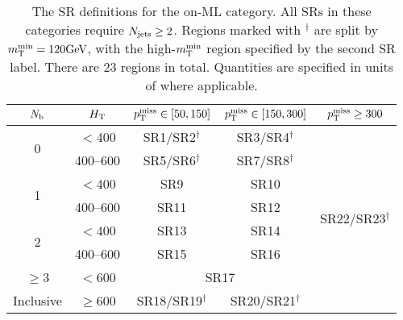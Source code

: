 \begin{table*}[htb!]
    \centering
            \begin{tabular}{|c|c|c|c|c|}
            \hline
                $N_\mathrm{b}$               & $H_{\mathrm{T}}$  & $p_{\mathrm{T}}^\text{miss}\in[50,150]$   & $p_{\mathrm{T}}^\text{miss}\in[150,300]$ & $p_{\mathrm{T}}^\text{miss}\geq300$ \\ \hline
                \multirow{2}{*}{0}      & $<$400      & SR1/SR2${}^\dagger$      & SR3/SR4${}^\dagger$     & \multirow{8}{*}{SR22/SR23${}^\dagger$}\\ \cline{2-2}
                                        & 400--600     & SR5/SR6${}^\dagger$      & SR7/SR8${}^\dagger$     & \\ \cline{1-2}
                \multirow{2}{*}{1}      & $<$400      & SR9                       & SR10                      & \\ \cline{2-2}
                                        & 400--600     & SR11                       & SR12                      & \\ \cline{1-2}
                \multirow{2}{*}{2}      & $<$400      & SR13                       & SR14                      & \\ \cline{2-2}
                                        & 400--600     & SR15                       & SR16                      & \\ \cline{1-4}
                $\geq$3                 & $<$600      & \multicolumn{2}{c|}{SR17}              & \\ \cline{1-4} 
                Inclusive               & $\geq$600   & SR18/SR19${}^\dagger$      & SR20/SR21${}^\dagger$     & \\ \hline
        \end{tabular} 
    \caption{\label{tab:SRDefMLonZ} The SR definitions for the on-\PZ ML category. All SRs in these categories require $N_\text{jets} \geq 2$.
        Regions marked with ${}^\dagger$ are split by $m_{\mathrm{T}}^{\text{min}}=120\text{GeV}$, with the high-$m_{\mathrm{T}}^{\text{min}}$ region specified by the second SR label.
        There are 23 regions in total.
        Quantities are specified in units of \GeV where applicable.}
\end{table*}


